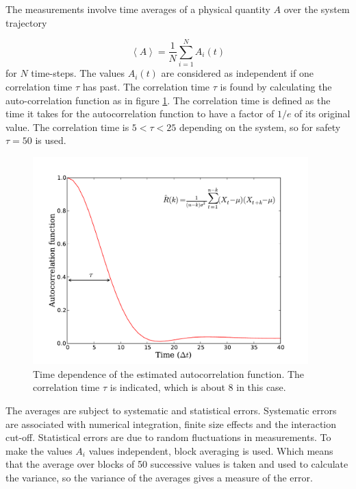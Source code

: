 \documentclass{article}
\begin{document}
The measurements involve time averages of a physical quantity $A$ over the system trajectory

\begin{equation}
 \left\langle  A \right\rangle = \frac{1}{N} \sum_{i=1}^N A_i(t)
\end{equation}
for $N$ time-steps. The values $A_i(t)$ are considered as independent if one correlation time $\tau$ has past. The correlation time $\tau$ is found by calculating the auto-correlation function as in figure \ref{fig:auto_correlation}. The correlation time is defined as the time it takes for the autocorrelation function to have a factor of $1/e$ of its original value. The correlation time is $5 < \tau <25$ depending on the system, so for safety $\tau=50$ is used. \\

\begin{figure}[!htb]
  \centering
    \includegraphics[height=80mm]{auto_correlation.pdf}
  \caption[]{Time dependence of the estimated autocorrelation function. The correlation time $\tau$ is indicated, which is about 8 in this case.}
  \label{fig:auto_correlation}
\end{figure}

The averages are subject to systematic and statistical errors. Systematic errors are associated with numerical integration, finite size effects and the interaction cut-off. Statistical errors are due to random fluctuations in measurements. To make the values $A_i$ values independent, block averaging \citep{blockavg} is used. Which means that the average over blocks of 50 successive values is taken and used to calculate the variance, so the variance of the averages gives a measure of the error. \\
\end{document}
